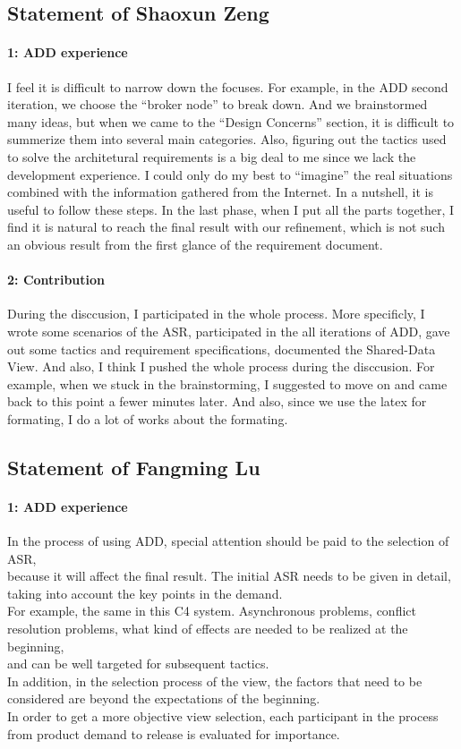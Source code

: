 \documentclass{article}
\begin{document}
	\subsection{Statement of Shaoxun Zeng}
	\paragraph{1: ADD experience}
	I feel it is difficult to narrow down the focuses. For example, in the ADD second iteration, we choose the “broker node” to break down. And we brainstormed many ideas, but when we came to the “Design Concerns” section, it is difficult to summerize them into several main categories.
Also, figuring out the tactics used to solve the architetural requirements is a big deal to me since we lack the development experience. I could only do my best to “imagine” the real situations combined with the information gathered from the Internet.
In a nutshell, it is useful to follow these steps. In the last phase, when I put all the parts together, I find it is natural to reach the final result with our refinement, which is not such an obvious result from the first glance of the requirement document.
	\paragraph{2: Contribution}
	During the disccusion, I participated in the whole process.
	More specificly, I wrote some scenarios of the ASR, participated in the all iterations of ADD, gave out some tactics and requirement specifications, documented the Shared-Data View.
	And also, I think I pushed the whole process during the disccusion. For example, when we stuck in the brainstorming, I suggested to move on and came back to this point a fewer minutes later. 
	And also, since we use the latex for formating, I do a lot of works about the formating.

	\subsection{Statement of Fangming Lu}
	\paragraph{1: ADD experience}
		In the process of using ADD, special attention should be paid to the selection of ASR, \\
	because it will affect the final result. The initial ASR needs to be given in detail, taking into account the key points in the demand. \\
	For example, the same in this C4 system. Asynchronous problems, conflict resolution problems, what kind of effects are needed to be realized at the beginning, \\
	and can be well targeted for subsequent tactics.\\
	In addition, in the selection process of the view, the factors that need to be considered are beyond the expectations of the beginning. \\
	In order to get a more objective view selection, each participant in the process from product demand to release is evaluated for importance.\\
\end{document}
